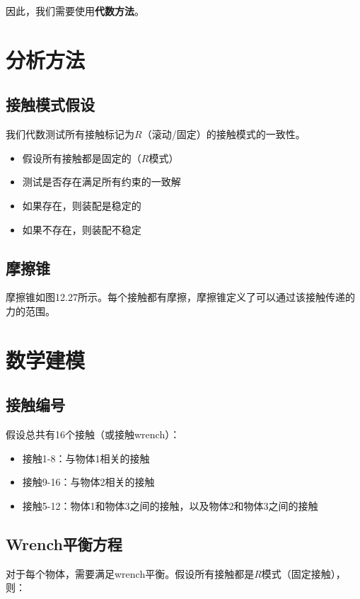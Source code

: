 \documentclass[12pt,a4paper]{article}
\begin{document}
因此，我们需要使用\textbf{代数方法}。

\section{分析方法}

\subsection{接触模式假设}

我们代数测试所有接触标记为$R$（滚动/固定）的接触模式的一致性。

\begin{itemize}
    \item 假设所有接触都是固定的（$R$模式）
    \item 测试是否存在满足所有约束的一致解
    \item 如果存在，则装配是稳定的
    \item 如果不存在，则装配不稳定
\end{itemize}

\subsection{摩擦锥}

摩擦锥如图12.27所示。每个接触都有摩擦，摩擦锥定义了可以通过该接触传递的力的范围。

\section{数学建模}

\subsection{接触编号}

假设总共有16个接触（或接触wrench）：
\begin{itemize}
    \item 接触1-8：与物体1相关的接触
    \item 接触9-16：与物体2相关的接触
    \item 接触5-12：物体1和物体3之间的接触，以及物体2和物体3之间的接触
\end{itemize}

\subsection{Wrench平衡方程}

对于每个物体，需要满足wrench平衡。假设所有接触都是$R$模式（固定接触），则：
\end{document}
